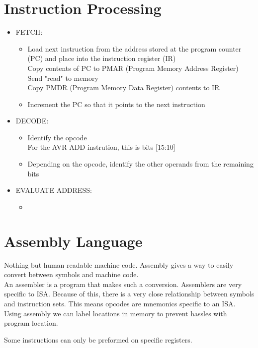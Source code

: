 \documentclass{article}
\begin{document}
\section{Instruction Processing}
\begin{itemize}
  \item {FETCH:
    \begin{itemize}
      \item Load next instruction from the address stored at the program counter (PC) and place into the instruction register (IR)\\
      Copy contents of PC to PMAR (Program Memory Address Register)\\
      Send "read" to memory\\
      Copy PMDR (Program Memory Data Register) contents to IR
      \item Increment the PC so that it points to the next instruction
    \end{itemize}
  }
  \item {DECODE:
    \begin{itemize}
      \item Identify the opcode\\
        For the AVR ADD instrution, this is bits [15:10]
      \item Depending on the opcode, identify the other operands from the remaining bits
    \end{itemize}
  }
  \item {EVALUATE ADDRESS:
    \begin{itemize}
      \item
    \end{itemize}
  }
\end{itemize}

\section{Assembly Language}
Nothing but human readable machine code. Assembly gives a way to easily convert between symbols and machine code.\\
An assembler is a program that makes such a conversion. Assemblers are very specific to ISA. Because of this, there is a very close relationship between symbols and instruction sets. This means opcodes are mnemonics specific to an ISA. Using assembly we can label locations in memory to prevent hassles with program location.

Some instructions can only be preformed on specific registers.
\end{document}
